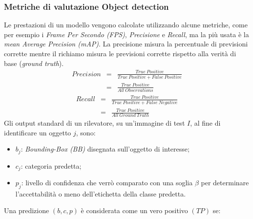\subsubsection{Metriche di valutazione Object detection}
Le prestazioni di un modello vengono calcolate utilizzando alcune metriche, come 
per esempio i \emph{Frame Per Secondo (FPS)}, \emph{Precisione} e \emph{Recall}, ma la più usata è la 
\emph{mean Average Precision (mAP)}. La precisione misura la percentuale di previsioni 
corrette mentre il richiamo misura le previsioni corrette rispetto alla verità 
di base (\emph{ground truth}).
\begin{eqnarray}\label{precision}
    Precision & = & \frac{True \ Positive}{True \ Positive + False \ Positive} \nonumber \\
             & = & \frac{True \ Positive}{All \ Observations}
\end{eqnarray}
\begin{eqnarray}\label{recall}
    Recall & = & \frac{True \ Positive}{True \ Positive + False \ Negative} \nonumber \\
             & = & \frac{True \ Positive}{All \ Ground \ Truth}
\end{eqnarray}
Gli output standard di un rilevatore, su un'immagine di test $I$, al fine di 
identificare un oggetto $j$, sono:
\begin{itemize}
    \item $b_j$: \emph{Bounding-Box (BB)} disegnata sull'oggetto di interesse;
    \item $c_j$: categoria predetta;
    \item $p_j$: livello di confidenza che verrò comparato con una soglia $\beta$ per determinare 
    l'accettabilità o meno dell'etichetta della classe predetta. 
\end{itemize}
Una predizione $(b,c,p)$ è considerata come un vero positivo $(TP)$ se:
